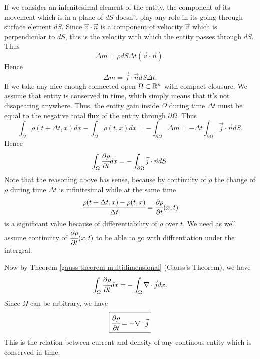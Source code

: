 \documentclass[main.tex]{subfiles}
\begin{document}
If we consider an infenitesimal element of the entity, the component of its movement which is in a plane of $dS$ doesn't play any role in its going through surface element $dS$. Since $\vec{v}\cdot \vec{n}$ is a component of veliocity $\vec{v}$ which is perpendicular to $dS$, this is the velocity with which the entity passes through $dS$. Thus
\begin{equation}
\Delta m = \rho dS\Delta t(\vec{v}\cdot\vec{n}).
\end{equation}
Hence 
\begin{equation}
\Delta m = \vec{j}\cdot\vec{n} dS\Delta t.
\end{equation}
If we take any nice enough connected open $\Omega\subset \mathbb{R}^n$ with compact clousure.
We assume that entity is conserved in time, which simply means that it's not disapearing anywhere. Thus, the entity gain inside $\Omega$ during time $\Delta t$ must be equal to the negative total flux of the entity through $\partial \Omega$. Thus
\begin{equation}
\int_\Omega \rho(t + \Delta t, x)dx - \int_\Omega \rho(t, x)dx = 
-\int_{\partial \Omega} \Delta m = -\Delta t \int_{\partial \Omega} \vec{j}\cdot\vec{n} dS.
\end{equation}
Hence
\begin{equation}
\int_\Omega \cfrac{\partial \rho}{\partial t} dx = -\int_{\partial \Omega} \vec{j}\cdot\vec{n} dS.
\end{equation}
Note that the reasoning above has sense, because by continuity of $\rho$ the change of $\rho$ during time $\Delta t$ is infinitesimal while at the same time $$\cfrac{\rho(t + \Delta t, x) - \rho(t, x)}{\Delta t} = \cfrac{\partial \rho}{\partial t}(x,t)$$ is a significant value because of differentiability of $\rho$ over $t$. We need as well assume continuity of $\cfrac{\partial \rho}{\partial t}(x,t)$ to be able to go with diffrentiation under the intergral.

Now by Theorem \ref{gauss-theorem-multidimensional} (Gauss's Theorem), we have
\begin{equation}
\int_\Omega \cfrac{\partial \rho}{\partial t}dx = -\int_\Omega \nabla \cdot \vec{j}dx.
\end{equation}
Since $\Omega$ can be arbitrary, we have
\begin{equation}
\boxed{\cfrac{\partial \rho}{\partial t} = -\nabla \cdot \vec{j}}
\end{equation}
This is the relation between current and density of any continous entity which is conserved in time.
\end{document}
